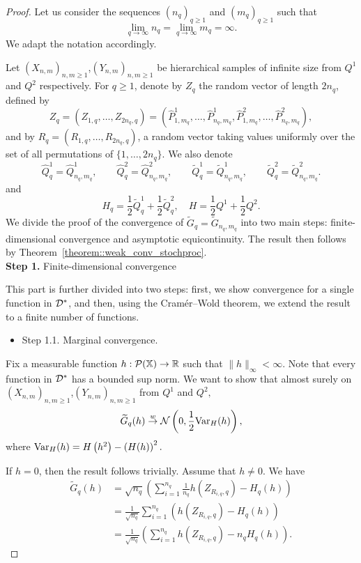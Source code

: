 \begin{proof}




Let us consider the sequences $(n_q)_{q\geq1}$ and $(m_q)_{q\geq1}$ such that
\[
\lim_{q \to \infty} n_q = \lim_{q \to \infty} m_q = \infty.
\]
We adapt the notation accordingly.

Let $(X_{n,m})_{n,m\geq 1}$,$(Y_{n,m})_{n,m\geq 1}$ be hierarchical samples of infinite size from $Q^1$ and $Q^2$ respectively. For $q \geq 1$, denote by $Z_q$ the random vector of length $2n_q$, defined by
\[
Z_q = \left(Z_{1, q},\dots,Z_{2n_q,q}\right)
= \left(\widehat{P}^1_{1,m_q},\dots,\widehat{P}^1_{n_q,m_q},
\widehat{P}^2_{1,m_q},\dots,\widehat{P}^2_{n_q,m_q}\right),
\]
and by $R_q = \left(R_{1,q},\dots,R_{2n_q,q}\right)$, a random vector taking values uniformly over the set of all permutations of $\{1,\dots,2n_q\}$. We also denote
\[
\widehat{Q}^1_q = \widehat{Q}^1_{n_q,m_q}, \qquad \widehat{Q}^2_q = \widehat{Q}^2_{n_q,m_q},\qquad 
\widetilde{Q}^1_q = \widetilde{Q}^1_{n_q,m_q},
\qquad
\widetilde{Q}^2_q = \widetilde{Q}^2_{n_q,m_q}.
\]
and 
\[
H_q = \frac{1}{2}\widetilde{Q}^1_q + \frac{1}{2}\widetilde{Q}^2_q, \quad 
H = \frac{1}{2}Q^1 + \frac{1}{2}Q^2.
\]
We divide the proof of the convergence of $\widetilde{G}_q = \widetilde{G}_{n_q,m_q}$ into two main steps: finite-dimensional convergence and asymptotic equicontinuity. The result then follows by Theorem~\ref{theorem::weak_conv_stochproc}.
\\
\textbf{Step 1.} Finite-dimensional convergence

This part is further divided into two steps: first, we show convergence for a single function in $\mathcal{D}^*$, and then, using the Cramér--Wold theorem, we extend the result to a finite number of functions.
\begin{itemize}
    \item Step 1.1. Marginal convergence.
\end{itemize}
Fix a measurable function $h : \mathcal{P}(\mathbb{X}) \to \mathbb{R}$ such that $\|h\|_\infty < \infty$. Note that every function in $\mathcal{D}^*$ has a bounded sup norm. We want to show that almost surely on $(X_{n,m})_{n,m\geq 1}$,$(Y_{n,m})_{n,m\geq 1}$ from $Q^1$ and $Q^2,$
\[
\widetilde{G}_q(h) \overset{w}{\to} \mathcal{N} \left(0, \frac{1}{2}\mathrm{Var}_H(h) \right),
\]
where $\mathrm{Var}_H(h) = H\left(h^2\right) - \left(H(h)\right)^2.$

If $h = 0$, then the result follows trivially. Assume that $h \neq 0$. We have
\begin{align*}
    \widetilde{G}_q(h)
    &= \sqrt{n_q}\left(\sum_{i = 1}^{n_q}\frac{1}{n_q}h(Z_{R_{i,q},q}) - H_q(h)\right) \\
    &= \frac{1}{\sqrt{n_q}}\sum_{i = 1}^{n_q}\left(h\left(Z_{R_{i,q},q}\right) - H_q(h)\right) \\
    &= \frac{1}{\sqrt{n_q}}\left(\sum_{i = 1}^{n_q}h\left(Z_{R_{i,q},q}\right) - n_qH_q(h) \right).
\end{align*}


\end{proof}

